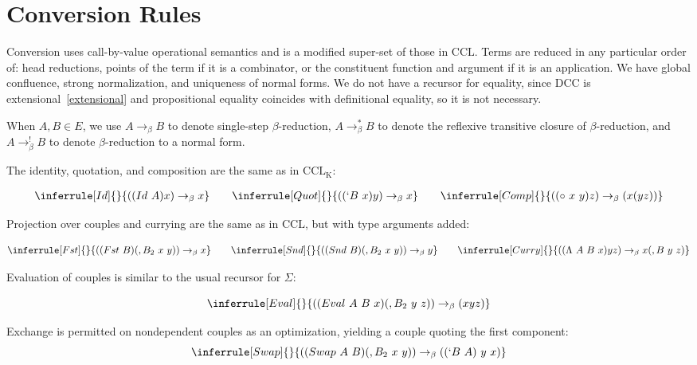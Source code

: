 \documentclass{lmcs}
\newcommand{\ccl}{\(\text{CCL}\)} %
\newcommand{\cclk}{\(\text{CCL}_\text{K}\)} %
\newcommand{\arr}{\rightarrow}
\newcommand{\barr}{\arr_{\beta}}
\begin{document}
\section{Conversion Rules}\label{sec:convrules}

Conversion uses call-by-value operational semantics and is a modified super-set of those in \ccl{}. Terms are reduced in any particular order of: head reductions, points of the term if it is a combinator, or the constituent function and argument if it is an application. We have global confluence, strong normalization, and uniqueness of normal forms. We do not have a recursor for equality, since DCC is extensional~\ref{extensional} and propositional equality coincides with definitional equality, so it is not necessary.

When \(A, B \in E\), we use \(A \barr B\) to denote single-step \(\beta\)-reduction, \(A \barr^{*} B\) to denote the reflexive transitive closure of \(\beta\)-reduction, and \(A \barr^{!} B\) to denote \(\beta\)-reduction to a normal form.

\begin{defi}\label{conv:idquotcomp}
  The identity, quotation, and composition are the same as in \cclk{}:
  
  \[
    \begin{gathered}
  \inferrule[Id]
  { }
  { (\comb[Id][A] x) \barr x} \qquad
  \inferrule[Quot]
  { }
  { (\comb[`B][x] y) \barr x}\qquad
  \inferrule[Comp]
  { }
  { (\comb[\circ][x][y] z) \barr (x (y z))}
  \end{gathered}
  \]
\end{defi}

\begin{defi}
  Projection over couples and currying are the same as in \ccl{}, but with type arguments added:

  \[
  \inferrule[Fst]
  { }
  { (\comb[Fst][B] \comb[,B_2][x][y]) \barr x}\qquad
  \inferrule[Snd]
  { }
  { (\comb[Snd][B] \comb[,B_2][x][y]) \barr y}\qquad
  \inferrule[Curry]
  { }
  { (\comb[\Lambda][A][B][x] y z) \barr x \comb[,B][y][z]}
  \]
\end{defi}

\begin{defi}
  Evaluation of couples is similar to the usual recursor for \(\Sigma\):

  \[
    \inferrule[Eval]
    { }
    { (\comb[Eval][A][B][x] \comb[,B_2][y][z]) \barr (x y z)}
  \]
\end{defi}

\begin{defi}
  Exchange is permitted on nondependent couples as an optimization, yielding a couple quoting the first component:
  \[
    \inferrule[Swap]
    { }
    { (\comb[Swap][A][B] \comb[,B_2][x][y]) \barr \comb[\comb[`B][A]][y][x]}
  \]
\end{defi}
\end{document}
